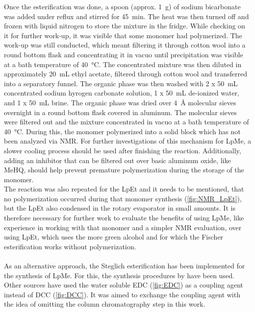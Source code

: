 \documentclass[11pt]{scrreport}
\let\cite=\supercite
\begin{document}
	Once the esterification was done, a spoon (approx. \SI{1}{\gram}) of sodium bicarbonate was added under reflux and stirred for \SI{45}{\minute}. The heat was then turned off and frozen with liquid nitrogen to store the mixture in the fridge. While checking on it for further work-up, it was visible that some monomer had polymerized. The work-up was still conducted, which meant filtering it through cotton wool into a round bottom flask and concentrating it in vacuo until precipitation was visible at a bath temperature of \SI{40}{\degreeCelsius}. The concentrated mixture was then diluted in approximately \SI{20}{\milli\liter} ethyl acetate, filtered through cotton wool and transferred into a separatory funnel. The organic phase was then washed with 2 x \SI{50}{\milli\liter} concentrated sodium hyrogen carbonate solution, 1 x \SI{50}{\milli\liter} de-ionized water, and 1 x \SI{50}{\milli\liter} brine. The organic phase was dried over \SI{4}{\AA} molecular sieves overnight in a round bottom flask covered in aluminum. The molecular sieves were filtered out and the mixture concentrated in vacuo at a bath temperature of \SI{40}{\degreeCelsius}. During this, the monomer polymerized into a solid block which has not been analyzed via \gls{NMR}. For further investigations of this mechanism for \gls{LpMe}, a slower cooling process should be used after finishing the reaction. Additionally, adding an inhibitor that can be filtered out over basic aluminum oxide, like \gls{MeHQ}, should help prevent premature polymerization during the storage of the monomer.\\
	The reaction was also repeated for the \gls{LpEt} and it needs to be mentioned, that no polymerization occurred during that monomer synthesis (\autoref{fig:NMR_LpEt}), but the \gls{LpEt} also condensed in the rotary evaporator in small amounts. It is therefore necessary for further work to evaluate the benefits of using \gls{LpMe}, like experience in working with that monomer and a simpler \gls{NMR} evaluation, over using \gls{LpEt}, which uses the more green alcohol and for which the Fischer esterification works without polymerization.\\\\
	As an alternative approach, the Steglich esterification has been implemented for the synthesis of \gls{LpMe}. For this, the synthesis procedures by \citeauthor{hylla_raft-derived_2025} have been used. Other sources have used the water soluble \gls{EDC} (\autoref{fig:EDC}) as a coupling agent instead of \gls{DCC} (\autoref{fig:DCC}). It was aimed to exchange the coupling agent with the idea of omitting the column chromatography step in this work. \cite{hylla_raft-derived_2025,koelbl_greener_2025}
\end{document}
